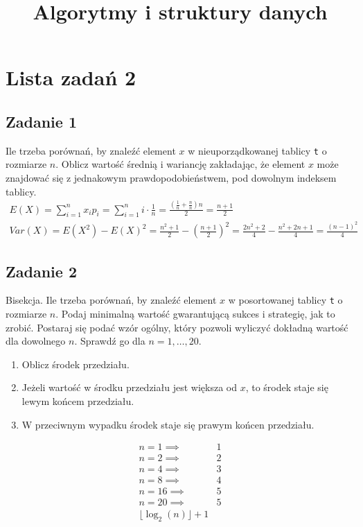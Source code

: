\documentclass{article}
\begin{document}
\title{Algorytmy i struktury danych}
\author{}
\date{}
\maketitle

\section*{Lista zadań 2}

\subsection*{Zadanie 1}
Ile trzeba porównań, by znaleźć element $x$ w nieuporządkowanej tablicy \verb|t| o rozmiarze
$n$. Oblicz wartość średnią i wariancję zakładając, że element $x$ może znajdować się z
jednakowym prawdopodobieństwem, pod dowolnym indeksem tablicy.
\begin{gather*}
    E(X) = \sum_{i=1}^{n} x_ip_i = \sum_{i=1}^{n} i \cdot \frac{1}{n} = \frac{\left(\frac{1}{n}+\frac{n}{n}\right)n}{2} = \frac{n+1}{2} \\
    Var(X) = E(X^2) - E(X)^2 = \frac{n^2+1}{2} - \left(\frac{n+1}{2}\right)^2 = \frac{2n^2+2}{4} - \frac{n^2+2n+1}{4} = \frac{(n-1)^2}{4}
\end{gather*}

\subsection*{Zadanie 2}
Bisekcja. Ile trzeba porównań, by znaleźć element $x$ w posortowanej tablicy \verb|t| o rozmiarze
$n$. Podaj minimalną wartość gwarantującą sukces i strategię, jak to zrobić. Postaraj się
podać wzór ogólny, który pozwoli wyliczyć dokładną wartość dla dowolnego $n$. Sprawdź go dla $n = 1, \dots, 20$.
\begin{enumerate}
    \item Oblicz środek przedziału.
    \item Jeżeli wartość w środku przedziału jest większa od $x$, to środek staje się lewym końcem przedziału.
    \item W przeciwnym wypadku środek staje się prawym końcen przedziału.
\end{enumerate}
\begin{align*}
    n=1 \implies  & 1 \\
    n=2 \implies  & 2 \\
    n=4 \implies  & 3 \\
    n=8 \implies  & 4 \\
    n=16 \implies & 5 \\
    n=20 \implies & 5 \\
    \lfloor \log_2(n) \rfloor + 1
\end{align*}
\end{document}
